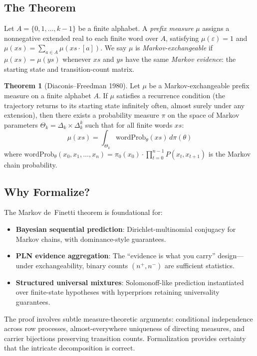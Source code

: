 \documentclass[11pt,a4paper]{article}
\theoremstyle{definition}
\newtheorem{theorem}{Theorem}[section]
\begin{document}
\subsection{The Theorem}

Let $A = \{0, 1, \ldots, k-1\}$ be a finite alphabet. A \emph{prefix measure}
$\mu$ assigns a nonnegative extended real to each finite word over $A$, satisfying
$\mu(\varepsilon) = 1$ and $\mu(xs) = \sum_{a \in A} \mu(xs \cdot [a])$. We say
$\mu$ is \emph{Markov-exchangeable} if $\mu(xs) = \mu(ys)$ whenever $xs$ and $ys$
have the same \emph{Markov evidence}: the starting state and transition-count matrix.

\begin{theorem}[Diaconis--Freedman 1980]\label{thm:df80}
Let $\mu$ be a Markov-exchangeable prefix measure on a finite alphabet $A$.
If $\mu$ satisfies a recurrence condition (the trajectory returns to its
starting state infinitely often, almost surely under any extension), then
there exists a probability measure $\pi$ on the space of Markov parameters
$\Theta_k = \Delta_k \times \Delta_k^k$ such that for all finite words $xs$:
\[
\mu(xs) = \int_{\Theta_k} \mathrm{wordProb}_\theta(xs) \, d\pi(\theta)
\]
where $\mathrm{wordProb}_\theta(x_0, x_1, \ldots, x_n) = \pi_0(x_0) \cdot \prod_{t=0}^{n-1} P(x_t, x_{t+1})$
is the Markov chain probability.
\end{theorem}

\subsection{Why Formalize?}

The Markov de~Finetti theorem is foundational for:
\begin{itemize}
\item \textbf{Bayesian sequential prediction}: Dirichlet-multinomial conjugacy
  for Markov chains, with dominance-style guarantees.
\item \textbf{PLN evidence aggregation}: The ``evidence is what you carry''
  design---under exchangeability, binary counts $(n^+, n^-)$ are sufficient
  statistics.
\item \textbf{Structured universal mixtures}: Solomonoff-like prediction
  instantiated over finite-state hypotheses with hyperpriors retaining
  universality guarantees.
\end{itemize}

The proof involves subtle measure-theoretic arguments: conditional independence
across row processes, almost-everywhere uniqueness of directing measures, and
carrier bijections preserving transition counts. Formalization provides
certainty that the intricate decomposition is correct.
\end{document}
